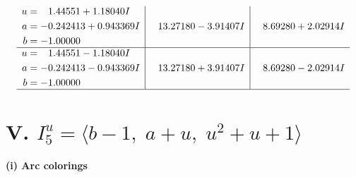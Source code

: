 \documentclass[1p]{elsarticle_modified}
\theoremstyle{definition}
\begin{document}
$$\begin{array}{c|c|c}
\begin{aligned}
u &= \phantom{-}1.44551 + 1.18040 I \\
a &= -0.242413 + 0.943369 I \\
b &= -1.00000\phantom{ +0.000000I}\end{aligned}
 & \phantom{-}13.27180 - 3.91407 I & \phantom{-}8.69280 + 2.02914 I \\ \hline\begin{aligned}
u &= \phantom{-}1.44551 - 1.18040 I \\
a &= -0.242413 - 0.943369 I \\
b &= -1.00000\phantom{ +0.000000I}\end{aligned}
 & \phantom{-}13.27180 + 3.91407 I & \phantom{-}8.69280 - 2.02914 I\\
 \hline 
 \end{array}$$\newpage\newpage\renewcommand{\arraystretch}{1}
\centering \section*{V. $I^u_{5}= \langle b-1,\;a+u,\;u^2+u+1 \rangle$}
\flushleft \textbf{(i) Arc colorings}\\
\end{document}
